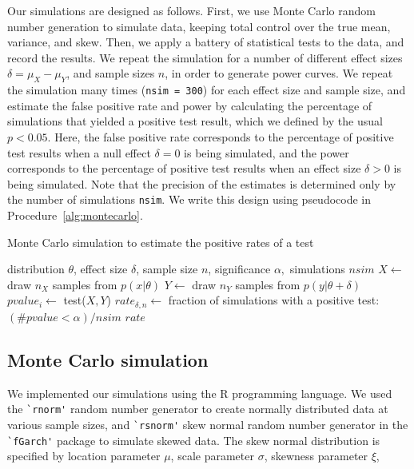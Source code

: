 \documentclass[10pt]{article} %
\begin{document}
Our simulations are designed as follows. First, we use Monte Carlo random number generation to simulate data, keeping total control over the true mean, variance, and skew. Then, we apply a battery of statistical tests to the data, and record the results. We repeat the simulation for a number of different effect sizes $\delta=\mu_X-\mu_Y$, and sample sizes $n$, in order to generate power curves. We repeat the simulation many times (\verb|nsim = 300|) for each effect size and sample size, and estimate the false positive rate and power by calculating the percentage of simulations that yielded a positive test result, which we defined by the usual $p<0.05$. Here, the false positive rate corresponds to the percentage of positive test results when a null effect $\delta=0$ is being simulated, and the power corresponds to the percentage of positive test results when an effect size $\delta>0$ is being simulated. Note that the precision of the estimates is determined only by the number of simulations \verb|nsim|. We write this design using pseudocode in Procedure~\ref{alg:montecarlo}.


\begin{algorithm}

\caption{Monte Carlo simulation to estimate the positive rates of a test}
\label{alg:montecarlo}
\begin{algorithmic} 
\REQUIRE distribution $\theta$, effect size $\delta$, sample size $n$, significance $\alpha,$ simulations $nsim$
 \STATE $X \leftarrow$ draw $n_X$ samples from $p(x|\theta)$
 \STATE $Y \leftarrow$ draw $n_Y$ samples from $p(y|\theta+\delta)$
 \STATE $pvalue_i \leftarrow$ test($X,Y$)
 \ENDFOR
 \STATE $rate_{\delta,n} \leftarrow$ fraction of simulations with a positive test: $(\#pvalue<\alpha)/nsim$ 
\ENDFOR
\ENDFOR
\ENSURE $rate$
\end{algorithmic}
\end{algorithm}


\subsection{Monte Carlo simulation}

We implemented our simulations using the R programming language. We used the \verb|`rnorm'| random number generator to create normally distributed data at various sample sizes, and \verb|`rsnorm'| skew normal random number generator in the \verb|`fGarch'| package to simulate skewed data. The skew normal distribution is specified by location parameter $\mu$, scale parameter $\sigma$, skewness parameter $\xi$,
\end{document}

